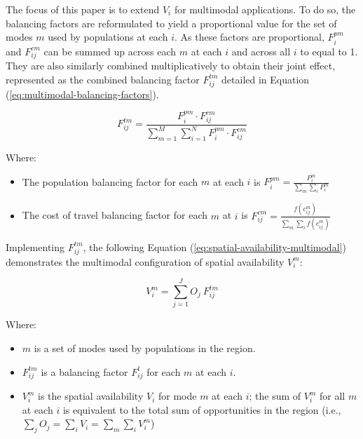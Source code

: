 \documentclass[]{trbunofficial}
\providecommand{\tightlist}{%
  \setlength{\itemsep}{0pt}\setlength{\parskip}{0pt}}
\begin{document}
The focus of this paper is to extend \(V_i\) for multimodal
applications. To do so, the balancing factors are reformulated to yield
a proportional value for the set of modes \(m\) used by populations at
each \(i\). As these factors are proportional, \(F^{pm}_{i}\) and
\(F^{cm}_{ij}\) can be summed up across each \(m\) at each \(i\) and
across all \(i\) to equal to 1. They are also similarly combined
multiplicatively to obtain their joint effect, represented as the
combined balancing factor \(F^{tm}_{ij}\) detailed in Equation
(\ref{eq:multimodal-balancing-factors}).

\begin{equation}
\label{eq:multimodal-balancing-factors}
F^{tm}_{ij} = \frac{F^{pm}_{i} \cdot F^{cm}_{ij}}{\sum_{m=1}^M \sum_{i=1}^N F^{pm}_{i} \cdot F^{cm}_{ij}}
\end{equation}

\noindent Where:

\begin{itemize}
\tightlist
\item
  The population balancing factor for each \(m\) at each \(i\) is
  \(F^{pm}_{i} = \frac{P_{i}^m}{\sum_{m}\sum_{i} P_{i}^m}\)
\item
  The cost of travel balancing factor for each \(m\) at \(i\) is
  \(F_{ij}^{cm} = \frac{f(c_{ij}^m)}{\sum_{m} \sum_{i} f(c_{ij}^m)}\)
\end{itemize}

Implementing \(F^{tm}_{ij}\), the following Equation
(\ref{eq:spatial-availability-multimodal}) demonstrates the multimodal
configuration of spatial availability \(V_i^m\):

\begin{equation}
\label{eq:spatial-availability-multimodal}
V^m_{i} = \sum_{j=1}^J O_j\ F^{tm}_{ij}
\end{equation}

\noindent Where:

\begin{itemize}
\tightlist
\item
  \(m\) is a set of modes used by populations in the region.
\item
  \(F^{tm}_{ij}\) is a balancing factor \(F^t_{ij}\) for each \(m\) at
  each \(i\).
\item
  \(V^m_{i}\) is the spatial availability \(V_{i}\) for mode \(m\) at
  each \(i\); the sum of \(V^m_{i}\) for all \(m\) at each \(i\) is
  equivalent to the total sum of opportunities in the region (i.e.,
  \(\sum_j O_j = \sum_i V_i = \sum_{m} \sum_{i} V^m_{i}\))
\end{itemize}
\end{document}
